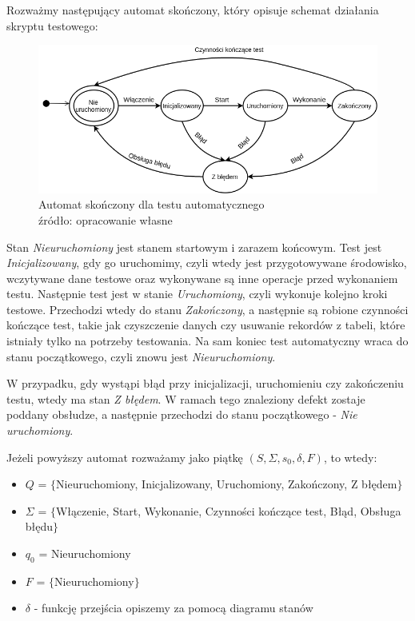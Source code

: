 \begin{df}
\begin{prz}
Rozważmy następujący automat skończony, który opisuje schemat działania skryptu testowego:


\begin{figure}[H]
\centering
\captionsetup{justification=centering}
\includegraphics[width=1\textwidth]{AutoTestFSM.png}
\caption[Automat skończony dla tes/'tu automatycznego]{\label{fig:autfsm}Automat skończony dla testu automatycznego \\ źródło: opracowanie własne}
\end{figure}


Stan \textit{Nieuruchomiony} jest stanem startowym i zarazem końcowym. Test jest \textit{Inicjalizowany}, gdy go uruchomimy, czyli wtedy jest przygotowywane środowisko, wczytywane dane testowe oraz wykonywane są inne operacje przed wykonaniem testu. Następnie test jest w stanie \textit{Uruchomiony}, czyli wykonuje kolejno kroki testowe. Przechodzi wtedy do stanu \textit{Zakończony}, a następnie są robione czynności kończące test, takie jak czyszczenie danych czy usuwanie rekordów z tabeli, które istniały tylko na potrzeby testowania. Na sam koniec test automatyczny wraca do stanu początkowego, czyli znowu jest \textit{Nieuruchomiony}.


W przypadku, gdy wystąpi błąd przy inicjalizacji, uruchomieniu czy zakończeniu testu, wtedy ma stan \textit{Z błędem}. W ramach tego znaleziony defekt zostaje poddany obsłudze, a następnie przechodzi do stanu początkowego - \textit{Nie uruchomiony}.


Jeżeli powyższy automat rozważamy jako piątkę $(S,\Sigma, s_0, \delta, F)$, to wtedy:
\begin{itemize}
    \item $Q$ = $\{$Nieuruchomiony, Inicjalizowany, Uruchomiony, Zakończony, Z błędem$\}$
    \item $\Sigma$ = $\{$Włączenie, Start, Wykonanie, Czynności kończące test, Błąd, Obsługa błędu$\}$ 
    \item $q_0$ = Nieuruchomiony
    \item $F$ = $\{$Nieuruchomiony$\}$
    \item $\delta$ - funkcję przejścia opiszemy za pomocą diagramu stanów
\end{itemize}


\end{prz}
\end{df}
